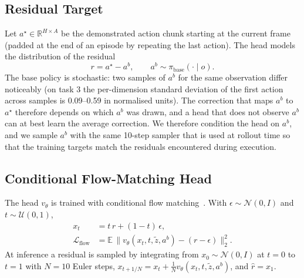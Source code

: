\documentclass[conference]{IEEEtran}
\begin{document}
\subsection{Residual Target}
Let $a^{\star}\in\mathbb{R}^{H\times A}$ be the demonstrated action chunk starting at the current frame (padded at the end of an episode by repeating the last action). The head models the distribution of the residual
\begin{equation}
    r = a^{\star}-a^{b}, \qquad a^{b}\sim\pi_{\text{base}}(\cdot\mid o).
    \label{eq:residual}
\end{equation}
The base policy is stochastic: two samples of $a^{b}$ for the same observation differ noticeably (on task 3 the per-dimension standard deviation of the first action across samples is 0.09--0.59 in normalised units). The correction that maps $a^{b}$ to $a^{\star}$ therefore depends on which $a^{b}$ was drawn, and a head that does not observe $a^{b}$ can at best learn the average correction. We therefore condition the head on $a^{b}$, and we sample $a^{b}$ with the same 10-step sampler that is used at rollout time so that the training targets match the residuals encountered during execution.

\subsection{Conditional Flow-Matching Head}
The head $v_\theta$ is trained with conditional flow matching~\cite{flowmatching}. With $\epsilon\sim\mathcal{N}(0,I)$ and $t\sim\mathcal{U}(0,1)$,
\begin{align}
    x_t &= t\,r+(1-t)\,\epsilon, \\
    \mathcal{L}_{\text{flow}} &= \mathbb{E}\,\bigl\lVert v_\theta(x_t,t,\tilde z,a^{b})-(r-\epsilon)\bigr\rVert_2^2 .
    \label{eq:loss}
\end{align}
At inference a residual is sampled by integrating from $x_0\sim\mathcal{N}(0,I)$ at $t=0$ to $t=1$ with $N=10$ Euler steps, $x_{t+1/N}=x_t+\tfrac{1}{N}v_\theta(x_t,t,\tilde z,a^{b})$, and $\hat r=x_1$.
\end{document}
